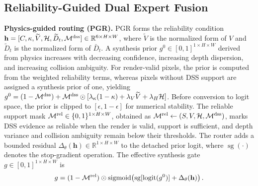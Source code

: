\documentclass[letterpaper,10pt,conference]{ieeeconf}
\newcommand{\R}{\mathbb{R}}
\newcommand{\M}{\mathcal{M}}
\begin{document}
\subsection{Reliability-Guided Dual Expert Fusion}
\label{sec:expert-fusion}

\textbf{Physics-guided routing (PGR).}
PGR forms the reliability condition
$\mathbf h=[C,\kappa,\widetilde V,\mathcal H,\widetilde D_t,\M^{\rm dss}]
\in\R^{6\times H\times W}$, where $\widetilde V$ is the normalized form of
$V$ and $\widetilde D_t$ is the normalized form of $\bar D_t$. A synthesis
prior $g^0\in[0,1]^{1\times H\times W}$ derived from physics increases with
decreasing confidence, increasing depth dispersion, and increasing collision ambiguity. For
render-valid pixels, the prior is computed from the weighted reliability terms,
whereas pixels without DSS support are assigned a synthesis prior of one,
yielding $g^0=(1-\M^{\rm dss})+\M^{\rm dss}\odot
[\lambda_\kappa(1-\kappa)+\lambda_V\widetilde V+\lambda_H\mathcal H]$.
Before conversion to logit space, the prior is clipped to
$[\epsilon,1-\epsilon]$ for numerical stability. 
The reliable support mask $\M^{\rm rel}\in\{0,1\}^{1\times H\times W}$,
obtained as $\M^{\rm rel}\leftarrow(S,V,\mathcal H,\M^{\rm dss})$, marks DSS
evidence as reliable when the render is valid, support is sufficient, and depth
variance and collision ambiguity remain below their thresholds. The router
adds a bounded residual $\Delta_\theta(\mathbf h)\in\R^{1\times H\times W}$
to the detached prior logit, where $\operatorname{sg}(\cdot)$ denotes the
stop-gradient operation.
The effective synthesis gate $g\in[0,1]^{1\times H\times W}$ is
\begin{equation}
 g=(1-\M^{\rm rel})\odot\operatorname{sigmoid}\!\left(
 \operatorname{sg}[\operatorname{logit}(g^0)]+\Delta_\theta(\mathbf h)\right).
\label{eq:effective-gate}
\end{equation}
\end{document}
